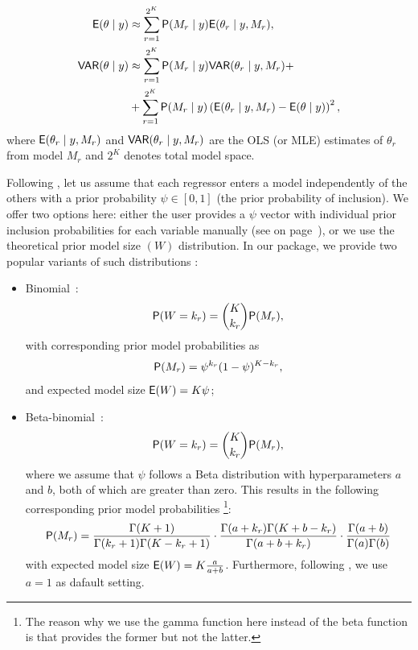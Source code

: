 \begin{align}
	\mathsf{E}(\theta \mid y) &\approx \sum_{r=1}^{2^K}\mathsf{P}(M_r\mid y)\mathsf{E}(\theta_r \mid y,M_r),\\\nonumber
	\mathsf{VAR}(\theta \mid y) &\approx 
	\sum_{r=1}^{2^K}\mathsf{P}(M_r \mid y)\mathsf{VAR}(\theta_r  \mid y,M_r) +\\
	&+ \sum_{r=1}^{2^K}\mathsf{P}(M_r \mid y) \left(\mathsf{E}(\theta_r \mid y, M_r) - \mathsf{E}(\theta \mid y)\right)^2,
\end{align}
where $\mathsf{E}(\theta_r \mid y,M_r)$ and $\mathsf{VAR}(\theta_r \mid y,M_r)$
are the OLS (or MLE) estimates of $\theta_r$
from model $M_r$ and $2^K$ denotes total model space.

Following \cite{Ley_Steel_jae_2009}, let us assume that
each regressor enters a model independently of the others
with a prior probability $\psi \in [0, 1]$ (the prior
probability of inclusion). We offer two options here:
either the user provides a $\psi$ vector with individual
prior inclusion probabilities for each variable manually
(see  on page~\pageref{opts:psi}),
or we use the theoretical prior model size $(W)$ distribution.
In our  package, we provide two popular variants
of such distributions \citep[see][]{Ley_Steel_jae_2009,steel2011}:
\begin{itemize}
	\item Binomial~\citep{Forsyth_2018}:
		\begin{equation}
			\mathsf{P}(W=k_r) = \binom{K}{k_r}\mathsf{P}(M_r),
			\label{eq:prior_model_size_binomial}
		\end{equation}
		with corresponding prior model probabilities as 
		\begin{equation}
			\mathsf{P}(M_r)=\psi^{k_r}(1-\psi)^{K-k_r},
			\label{eq:prior_model_probs_binomial}
		\end{equation}
		and expected model size $\mathsf{E}(W) = K\psi$;
	\item Beta-binomial~\citep{wakefield2013bayesian}:
		\begin{equation}
			\mathsf{P}(W=k_r) = \binom{K}{k_r}\mathsf{P}(M_r),
			\label{eq:prior_model_size_binomial-beta}
		\end{equation}
		where we assume that $\psi$ follows a Beta
		distribution with hyperparameters $a$ and $b$, both
		of which are greater than zero. This results in the
		following corresponding prior model probabilities%
		\footnote{The reason why we use the gamma function
			here instead of the beta function is that
			 provides the former but not the latter.}:
		\begin{equation}
			\mathsf{P}(M_r) = \frac{\Gamma (K+1)}{\Gamma(k_r+1)\Gamma(K-k_r+1)}\cdot
			\frac{\Gamma(a+k_r)\Gamma(K+b-k_r)}{\Gamma(a+b+k_r)} \cdot \frac{\Gamma(a+b)}{\Gamma(a)\Gamma(b)}
			\label{eq:prior_model_probs_binomial-beta}
		\end{equation}
		with expected model size $\mathsf{E}(W) = K\frac{a}{a+b}$.
		Furthermore, following \cite{Ley_Steel_jae_2009},
		we use $a = 1$ as dafault setting.
\end{itemize}

